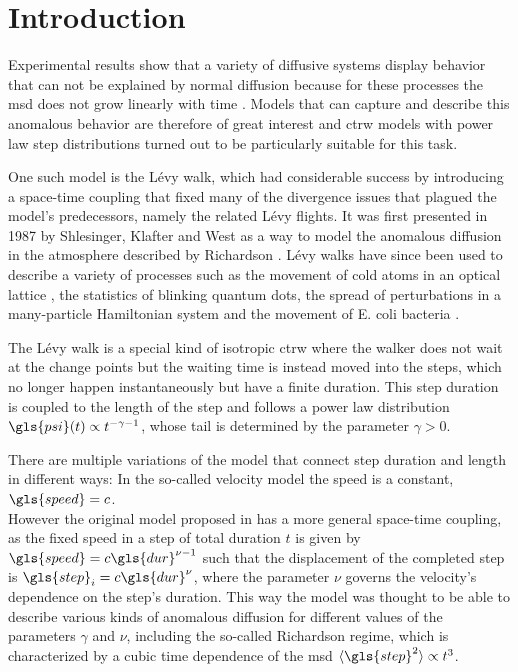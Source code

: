\chapter{Introduction}

Experimental results show that a variety of diffusive systems display behavior that can not be explained by normal diffusion because for these processes the \gls{msd} does not grow linearly with time
\cite{najafi2017,sagi2012,marty2005,amblard1996}
. 
Models that can capture and describe this anomalous behavior are therefore of great interest and \gls{ctrw} models with power law step distributions turned out to be particularly suitable for this task.

One such model is the L\'evy walk, which had considerable success by introducing a space-time coupling that fixed many of the divergence issues that plagued the model's predecessors, namely the related L\'evy flights. It was first presented in 1987 by Shlesinger, Klafter and West 
\cite{shlesinger1987} 
as a way to model the anomalous diffusion in the atmosphere described by Richardson 
\cite{richardson}. 
L\'evy walks have since been used to describe a variety of processes 
\cite{lwreview} 
such as the movement of cold atoms in an optical lattice 
\cite{marksteiner1996}, 
the statistics of blinking quantum dots, the spread of perturbations in a many-particle Hamiltonian system 
\cite{zaburdaev2011perturbation} 
and the movement of E. coli bacteria 
\cite{korobkova2004}.

The L\'evy walk is a special kind of isotropic \gls{ctrw} where the walker does not wait at the change points but the waiting time is instead moved into the steps, which no longer happen instantaneously but have a finite duration. This step duration is coupled to the length of the step and follows a power law distribution $\gls{psi}(t) \propto t^{-\gamma-1}$, whose tail is determined by the parameter $\gamma>0$. 

There are multiple variations of the model that connect step duration and length in different ways: In the so-called velocity model the speed is a constant, $\gls{speed} = c$.\\
However the original model proposed in 
\cite{shlesinger1987} 
has a more general space-time coupling, as the fixed speed in a step of total duration $t$ is given by $\gls{speed} = c  \gls{dur}^{\nu-1}$ such that the displacement of the completed step is $\gls{step}_i = c \gls{dur}^{\nu}$, where the parameter $\nu$ governs the velocity's dependence on the step's duration. This way the model was thought to be able to describe various kinds of anomalous diffusion for different values of the parameters $\gamma$ and $\nu$, including the so-called Richardson regime, which is characterized by a cubic time dependence of the \gls{msd} $\mean{\gls{step}^2} \propto t^3$. 

